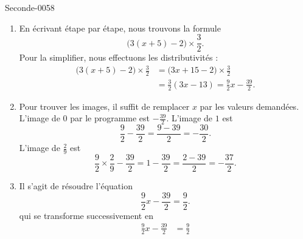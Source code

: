 
\begin{corrige}{Seconde-0058}

    \begin{enumerate}
        \item
            En écrivant étape par étape, nous trouvons la formule
            \begin{equation}
                \Big( 3(x+5)-2 \Big)\times\frac{ 3 }{2}.
            \end{equation}
            Pour la simplifier, nous effectuons les distributivités :
            \begin{subequations}
                \begin{align}
                    \Big( 3(x+5)-2 \Big)\times\frac{ 3 }{2}&=\big( 3x+15-2 \big)\times\frac{ 3 }{2}\\
                    &=\frac{ 3 }{2}(3x-13)=\frac{ 9 }{2}x-\frac{ 39 }{2}.
                \end{align}
            \end{subequations}
        \item
            Pour trouver les images, il suffit de remplacer \( x\) par les valeurs demandées. L'image de \( 0\) par le programme est \( -\frac{ 39 }{2}\). L'image de \( 1\) est 
            \begin{equation}
                \frac{ 9 }{ 2 }-\frac{ 39 }{ 2 }=\frac{ 9-39 }{2}=-\frac{ 30 }{ 2 }.
            \end{equation}
            L'image de \( \frac{ 2 }{ 9 }\) est
            \begin{equation}
                \frac{ 9 }{2}\times \frac{ 2 }{ 9 }-\frac{ 39 }{ 2 }=1-\frac{ 39 }{2}=\frac{ 2-39 }{2}=-\frac{ 37 }{2}.
            \end{equation}
        \item
            Il s'agit de résoudre l'équation
            \begin{equation}
                \frac{ 9 }{2}x-\frac{ 39 }{ 2 }=\frac{ 9 }{2}.
            \end{equation}
            qui se transforme successivement en
            \begin{subequations}
                \begin{align}
                    \frac{ 9 }{2}x-\frac{ 39 }{ 2 }&=\frac{ 9 }{2}\\

\end{align}
\end{subequations}
\end{enumerate}
\end{corrige}
